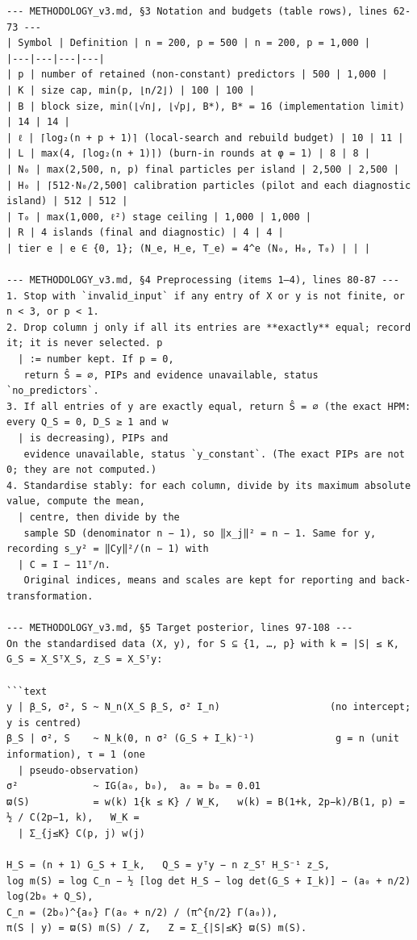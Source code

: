 \documentclass[11pt]{report}
\begin{document}
\begin{Verbatim}[fontsize=\footnotesize,formatcom=\qfont]
--- METHODOLOGY_v3.md, §3 Notation and budgets (table rows), lines 62-73 ---
| Symbol | Definition | n = 200, p = 500 | n = 200, p = 1,000 |
|---|---|---|---|
| p | number of retained (non-constant) predictors | 500 | 1,000 |
| K | size cap, min(p, ⌊n/2⌋) | 100 | 100 |
| B | block size, min(⌊√n⌋, ⌊√p⌋, B*), B* = 16 (implementation limit) | 14 | 14 |
| ℓ | ⌈log₂(n + p + 1)⌉ (local-search and rebuild budget) | 10 | 11 |
| L | max(4, ⌈log₂(n + 1)⌉) (burn-in rounds at φ = 1) | 8 | 8 |
| N₀ | max(2,500, n, p) final particles per island | 2,500 | 2,500 |
| H₀ | ⌈512·N₀/2,500⌉ calibration particles (pilot and each diagnostic island) | 512 | 512 |
| T₀ | max(1,000, ℓ²) stage ceiling | 1,000 | 1,000 |
| R | 4 islands (final and diagnostic) | 4 | 4 |
| tier e | e ∈ {0, 1}; (N_e, H_e, T_e) = 4^e (N₀, H₀, T₀) | | |

--- METHODOLOGY_v3.md, §4 Preprocessing (items 1–4), lines 80-87 ---
1. Stop with `invalid_input` if any entry of X or y is not finite, or n < 3, or p < 1.
2. Drop column j only if all its entries are **exactly** equal; record it; it is never selected. p
  | := number kept. If p = 0,
   return Ŝ = ∅, PIPs and evidence unavailable, status `no_predictors`.
3. If all entries of y are exactly equal, return Ŝ = ∅ (the exact HPM: every Q_S = 0, D_S ≥ 1 and w
  | is decreasing), PIPs and
   evidence unavailable, status `y_constant`. (The exact PIPs are not 0; they are not computed.)
4. Standardise stably: for each column, divide by its maximum absolute value, compute the mean,
  | centre, then divide by the
   sample SD (denominator n − 1), so ‖x_j‖² = n − 1. Same for y, recording s_y² = ‖Cy‖²/(n − 1) with
  | C = I − 11ᵀ/n.
   Original indices, means and scales are kept for reporting and back-transformation.

--- METHODOLOGY_v3.md, §5 Target posterior, lines 97-108 ---
On the standardised data (X, y), for S ⊆ {1, …, p} with k = |S| ≤ K, G_S = X_SᵀX_S, z_S = X_Sᵀy:

```text
y | β_S, σ², S ~ N_n(X_S β_S, σ² I_n)                   (no intercept; y is centred)
β_S | σ², S    ~ N_k(0, n σ² (G_S + I_k)⁻¹)              g = n (unit information), τ = 1 (one
  | pseudo-observation)
σ²             ~ IG(a₀, b₀),  a₀ = b₀ = 0.01
ϖ(S)           = w(k) 1{k ≤ K} / W_K,   w(k) = B(1+k, 2p−k)/B(1, p) = ½ / C(2p−1, k),   W_K =
  | Σ_{j≤K} C(p, j) w(j)

H_S = (n + 1) G_S + I_k,   Q_S = yᵀy − n z_Sᵀ H_S⁻¹ z_S,
log m(S) = log C_n − ½ [log det H_S − log det(G_S + I_k)] − (a₀ + n/2) log(2b₀ + Q_S),
C_n = (2b₀)^{a₀} Γ(a₀ + n/2) / (π^{n/2} Γ(a₀)),
π(S | y) = ϖ(S) m(S) / Z,   Z = Σ_{|S|≤K} ϖ(S) m(S).


\end{Verbatim}
\end{document}
